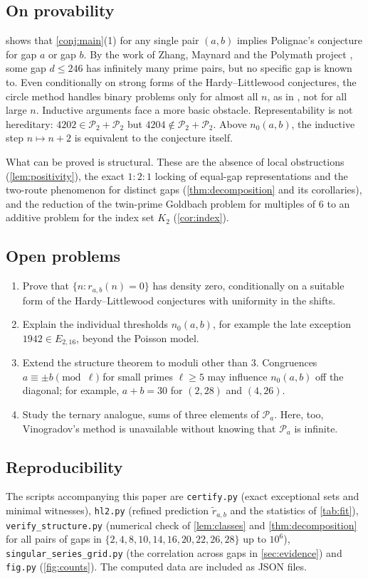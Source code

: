 \documentclass[11pt]{amsart}
\theoremstyle{definition}
\theoremstyle{remark}
\newcommand{\PP}{\mathcal{P}}
\begin{document}
\subsection{On provability}
 shows that \cref{conj:main}(1) for any single pair $(a,b)$ implies Polignac's conjecture for gap $a$ or gap $b$. By the work of Zhang, Maynard and the Polymath project \cite{Zhang2014,Maynard2015,Polymath2014}, some gap $d\le 246$ has infinitely many prime pairs, but no specific gap is known to. Even conditionally on strong forms of the Hardy--Littlewood conjectures, the circle method \cite{Vaughan1997} handles binary problems only for almost all $n$, as in \cite{MontgomeryVaughan1975}, not for all large $n$. Inductive arguments face a more basic obstacle. Representability is not hereditary: $4202\in\PP_2+\PP_2$ but $4204\notin\PP_2+\PP_2$. Above $n_0(a,b)$, the inductive step $n\mapsto n+2$ is equivalent to the conjecture itself.

What can be proved is structural. These are the absence of local obstructions (\cref{lem:positivity}), the exact $1:2:1$ locking of equal-gap representations and the two-route phenomenon for distinct gaps (\cref{thm:decomposition} and its corollaries), and the reduction of the twin-prime Goldbach problem for multiples of $6$ to an additive problem for the index set $K_2$ (\cref{cor:index}).

\subsection{Open problems}
\begin{enumerate}
\item Prove that $\{n: r_{a,b}(n)=0\}$ has density zero, conditionally on a suitable form of the Hardy--Littlewood conjectures with uniformity in the shifts.
\item Explain the individual thresholds $n_0(a,b)$, for example the late exception $1942\in E_{2,16}$, beyond the Poisson model.
\item Extend the structure theorem to moduli other than $3$. Congruences $a\equiv\pm b\pmod\ell$ for small primes $\ell\ge5$ may influence $n_0(a,b)$ off the diagonal; for example, $a+b=30$ for $(2,28)$ and $(4,26)$.
\item Study the ternary analogue, sums of three elements of $\PP_a$. Here, too, Vinogradov's method is unavailable without knowing that $\PP_a$ is infinite.
\end{enumerate}

\subsection*{Reproducibility}
The scripts accompanying this paper are \texttt{certify.py} (exact exceptional sets and minimal witnesses), \texttt{hl2.py} (refined prediction $\widetilde r_{a,b}$ and the statistics of \cref{tab:fit}), \texttt{verify\_structure.py} (numerical check of \cref{lem:classes} and \cref{thm:decomposition} for all pairs of gaps in $\{2,4,8,10,14,16,20,22,26,28\}$ up to $10^6$), \texttt{singular\_series\_grid.py} (the correlation across gaps in \cref{sec:evidence}) and \texttt{fig.py} (\cref{fig:counts}). The computed data are included as JSON files.



\end{document}
